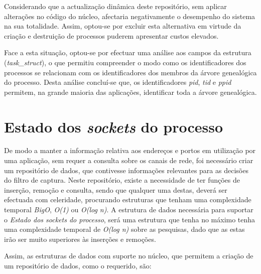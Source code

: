 Considerando que a actualização dinâmica deste repositório, sem aplicar alterações no código do núcleo, afectaria negativamente o desempenho do sistema na sua totalidade.
Assim, optou-se por excluir esta alternativa em virtude da criação e destruição de processos puderem apresentar custos elevados.


Face a esta situação, optou-se por efectuar uma análise aos campos da estrutura (\textit{task\_struct}), o que permitiu compreender o modo como os identificadores dos processos se relacionam com os identificadores dos membros da árvore genealógica do processo.
Desta análise concluí-se que, os identificadores \textit{pid}, \textit{tid} e \textit{ppid} permitem, na grande maioria das aplicações, identificar toda a árvore genealógica.





\section{Estado dos \textit{sockets} do processo}

De modo a manter a informação relativa aos endereços e portos em utilização por uma aplicação, sem requer a consulta sobre os canais de rede, foi necessário criar um repositório de dados, que contivesse informações relevantes para as decisões do filtro de captura.
Neste repositório, existe a necessidade de ter funções de inserção, remoção e consulta, sendo que qualquer uma destas, deverá ser efectuada com celeridade, procurando estruturas que tenham uma complexidade temporal \textit{BigO}, \textit{O(1)} ou \textit{O(log n)}.
A estrutura de dados necessária para suportar o \textit{Estado dos sockets do processo}, será uma estrutura que tenha no máximo tenha uma complexidade temporal de \textit{O(log n)} sobre as pesquisas, dado que as estas irão ser muito superiores às inserções e remoções.

Assim, as estruturas de dados com suporte no núcleo, que permitem a criação de um repositório de dados, como o requerido, são:


